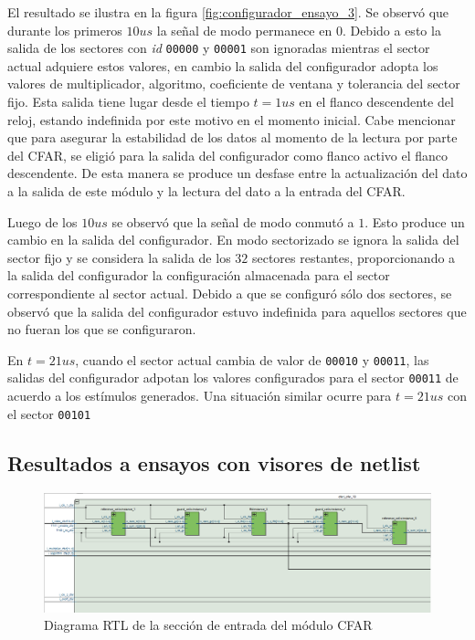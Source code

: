 El resultado se ilustra en la figura \ref{fig:configurador_ensayo_3}. Se observó que durante los primeros $10 us$ la señal de modo permanece en $0$. Debido a esto la salida de los sectores con \textit{id} \texttt{00000} y \texttt{00001} son ignoradas mientras el sector actual adquiere estos valores, en cambio la salida del configurador adopta los valores de multiplicador, algoritmo, coeficiente de ventana y tolerancia del sector fijo. Esta salida tiene lugar desde el tiempo $t = 1 us$ en el flanco descendente del reloj, estando indefinida por este motivo en el momento inicial. Cabe mencionar que para asegurar la estabilidad de los datos al momento de la lectura por parte del CFAR, se eligió para la salida del configurador como flanco activo el flanco descendente. De esta manera se produce un desfase entre la actualización del dato a la salida de este módulo y la lectura del dato a la entrada del CFAR.

Luego de los $10 us$ se observó que la señal de modo conmutó a $1$. Esto produce un cambio en la salida del configurador. En modo sectorizado se ignora la salida del sector fijo y se considera la salida de los $32$ sectores restantes, proporcionando a la salida del configurador la configuración almacenada para el sector correspondiente al sector actual. Debido a que se configuró sólo dos sectores, se observó que la salida del configurador estuvo indefinida para aquellos sectores que no fueran los que se configuraron.

En $t = 21 us$, cuando el sector actual cambia de valor de \texttt{00010} y \texttt{00011}, las salidas del configurador adpotan los valores configurados para el sector \texttt{00011} de acuerdo a los estímulos generados. Una situación similar ocurre para $t = 21 us$ con el sector \texttt{00101}



\subsection{Resultados a ensayos con visores de netlist}
\label{Subsec: Resultados de Visores de netlist}

\begin{figure}
\centering
\includegraphics[scale=0.6, angle=270]{./Figures/RTL_cfar_1.png}
\caption{Diagrama RTL de la sección de entrada del módulo CFAR}
\label{fig:RTL_cfar_1}
\end{figure}


